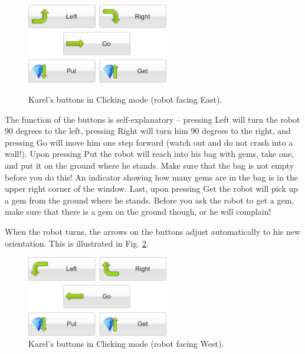 \begin{figure}[!ht]
\begin{center}
\includegraphics[width=6.2cm]{imgk/buttons-all.png}
\vspace{-0mm}
\caption{Karel's buttons in Clicking mode (robot facing East).}
\vspace{-1cm}
\label{fig:buttons}
\end{center}
\end{figure}
\newpage
\noindent
The function of the buttons is self-explanatory -- pressing Left will turn the robot 90 degrees to the left,
pressing Right will turn him 90 degrees to the right, and pressing Go will move him one step forward 
(watch out and do not crash into a wall!). Upon pressing Put the robot will reach into his bag with gems, 
take one, and put it on the ground where he stands. Make sure that the bag is not empty before you do this!
An indicator showing how many gems are in the bag is in the upper right corner of the window. Last, upon pressing 
Get the robot will pick up a gem from the ground where he stands. Before you ask the robot to get a gem,
make sure that there is a gem on the ground though, or he will complain!

When the robot turns, the arrows on the buttons adjust automatically to his new 
orientation. This is illustrated in Fig. \ref{fig:buttons2}.
\begin{figure}[!ht]
\begin{center}
\includegraphics[width=6.2cm]{imgk/buttons-all-2.png}
\vspace{-0mm}
\caption{Karel's buttons in Clicking mode (robot facing West).}
\label{fig:buttons2}
\end{center}
\end{figure}


